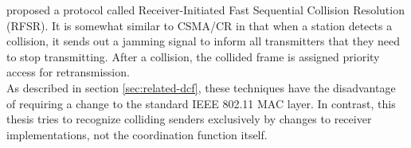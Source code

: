 \cite{jibukumar2015} proposed a protocol called Receiver-Initiated Fast Sequential Collision Resolution (RFSR). It is somewhat similar to CSMA/CR \cite{choi2013} in that when a station detects a collision, it sends out a jamming signal to inform all transmitters that they need to stop transmitting. After a collision, the collided frame is assigned priority access for retransmission.\\

As described in section \ref{sec:related-dcf}, these techniques have the disadvantage of requiring a change to the standard IEEE 802.11 MAC layer. In contrast, this thesis tries to recognize colliding senders exclusively by changes to receiver implementations, not the coordination function itself.
